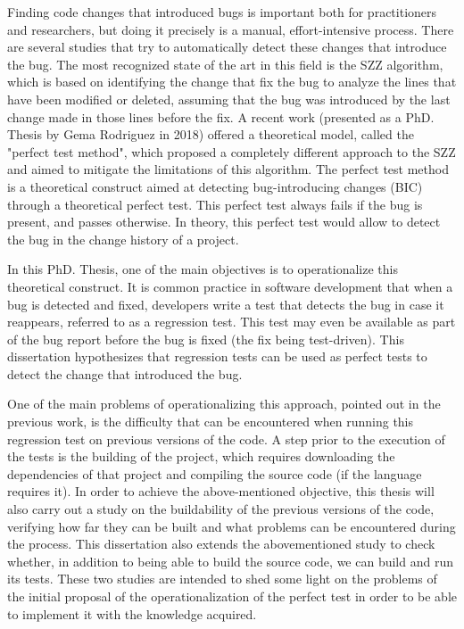 Finding code changes that introduced bugs is important both for practitioners and researchers, but doing it precisely is a manual, effort-intensive process.
There are several studies that try to automatically detect these changes that introduce the bug. 
The most recognized state of the art in this field is the SZZ algorithm, which is based on identifying the change that fix the bug to analyze the lines that have been modified or deleted, assuming that the bug was introduced by the last change made in those lines before the fix. 
A recent work (presented as a PhD. Thesis by Gema Rodriguez in 2018) offered a theoretical model, called the "perfect test method", which proposed a completely different approach to the SZZ and aimed to mitigate the limitations of this algorithm. 
The perfect test method is a theoretical construct aimed at detecting bug-introducing changes (BIC) through a theoretical perfect test. This perfect test always fails if the bug is present, and passes otherwise.
In theory, this perfect test would allow to detect the bug in the change history of a project.

In this PhD. Thesis, one of the main objectives is to operationalize this theoretical construct.
It is common practice in software development that when a bug is detected and fixed, developers write a test that detects the bug in case it reappears, referred to as a regression test. 
This test may even be available as part of the bug report before the bug is fixed (the fix being test-driven). 
This dissertation hypothesizes that regression tests can be used as perfect tests to detect the change that introduced the bug. 

One of the main problems of operationalizing this approach, pointed out in the previous work, is the difficulty that can be encountered when running this regression test on previous versions of the code. 
A step prior to the execution of the tests is the building of the project, which requires downloading the dependencies of that project and compiling the source code (if the language requires it). 
In order to achieve the above-mentioned objective, this thesis will also carry out a study on the buildability of the previous versions of the code, verifying how far they can be built and what problems can be encountered during the process.
This dissertation also extends the abovementioned study to check whether, in addition to being able to build the source code, we can build and run its tests. 
These two studies are intended to shed some light on the problems of the initial proposal of the operationalization of the perfect test in order to be able to implement it with the knowledge acquired.

